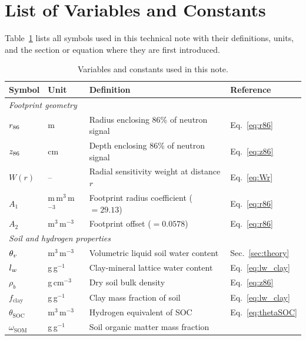 \section{List of Variables and Constants}
\label{app:vars}

Table~\ref{tab:variables} lists all symbols used in this technical
note with their definitions, units, and the section or equation
where they are first introduced.

\begin{table}[H]
\centering
\caption{Variables and constants used in this note.}
\label{tab:variables}
\small
\begin{tabularx}{\linewidth}{llXl}
\toprule
Symbol & Unit & Definition & Reference \\
\midrule
\multicolumn{4}{l}{\textit{Footprint geometry}} \\
$r_{86}$     & m & Radius enclosing 86\% of neutron signal
                 & Eq.~\eqref{eq:r86} \\
$z_{86}$     & cm & Depth enclosing 86\% of neutron signal
                 & Eq.~\eqref{eq:z86} \\
$W(r)$     & -- & Radial sensitivity weight at distance $r$
                 & Eq.~\eqref{eq:Wr} \\
$A_1$      & m\,m$^3$\,m$^{-3}$ & Footprint radius coefficient ($= 29.13$)
                 & Eq.~\eqref{eq:r86} \\
$A_2$      & m$^3$\,m$^{-3}$ & Footprint offset ($= 0.0578$)
                 & Eq.~\eqref{eq:r86} \\
\midrule
\multicolumn{4}{l}{\textit{Soil and hydrogen properties}} \\
$\theta_v$  & m$^3$\,m$^{-3}$ & Volumetric liquid soil water content
                 & Sec.~\ref{sec:theory} \\
$l_w$      & g\,g$^{-1}$ & Clay-mineral lattice water content
                 & Eq.~\eqref{eq:lw_clay} \\
$\rho_b$   & g\,cm$^{-3}$ & Dry soil bulk density
                 & Eq.~\eqref{eq:z86} \\
$f_\mathrm{clay}$ & g\,g$^{-1}$ & Clay mass fraction of soil
                 & Eq.~\eqref{eq:lw_clay} \\
$\theta_\mathrm{SOC}$ & m$^3$\,m$^{-3}$ & Hydrogen equivalent of SOC
                 & Eq.~\eqref{eq:thetaSOC} \\
$\omega_\mathrm{SOM}$ & g\,g$^{-1}$ & Soil organic matter mass fraction

\end{tabularx}
\end{table}
